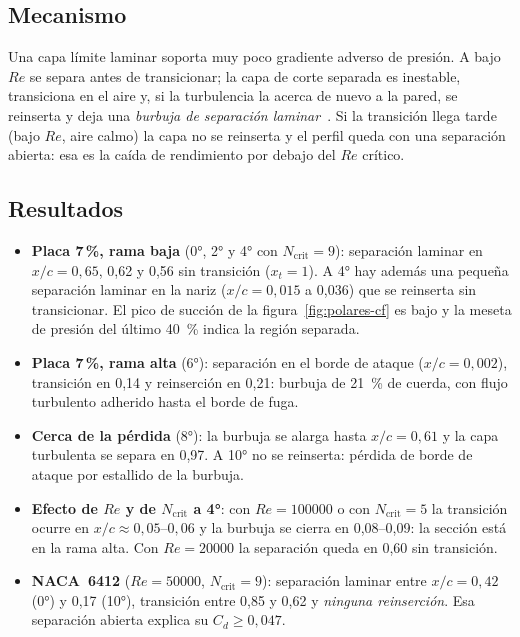 \subsection{Mecanismo}
Una capa límite laminar soporta muy poco gradiente adverso de presión. A bajo $Re$ se
separa antes de transicionar; la capa de corte separada es inestable, transiciona en el
aire y, si la turbulencia la acerca de nuevo a la pared, se reinserta y deja una
\emph{burbuja de separación laminar}~\cite{lissaman1983,mueller2003}. Si la transición
llega tarde (bajo $Re$, aire calmo) la capa no se reinserta y el perfil queda con una
separación abierta: esa es la caída de rendimiento por debajo del $Re$ crítico.

\subsection{Resultados}
\begin{itemize}
  \item \textbf{Placa 7\,\%, rama baja} (\ang{0}, \ang{2} y \ang{4} con
        $N_{\text{crit}}=9$): separación laminar en $x/c=0{,}65$, 0,62 y 0,56 sin
        transición ($x_t=1$). A \ang{4} hay además una pequeña separación laminar en la
        nariz ($x/c=0{,}015$ a 0,036) que se reinserta sin transicionar. El pico de
        succión de la figura~\ref{fig:polares-cf} es bajo y la meseta de presión del
        último \SI{40}{\percent} indica la región separada.
  \item \textbf{Placa 7\,\%, rama alta} (\ang{6}): separación en el borde de ataque
        ($x/c=0{,}002$), transición en 0,14 y reinserción en 0,21: burbuja de
        \SI{21}{\percent} de cuerda, con flujo turbulento adherido hasta el borde de fuga.
  \item \textbf{Cerca de la pérdida} (\ang{8}): la burbuja se alarga hasta $x/c=0{,}61$ y
        la capa turbulenta se separa en 0,97. A \ang{10} no se reinserta: pérdida de
        borde de ataque por estallido de la burbuja.
  \item \textbf{Efecto de $Re$ y de $N_{\text{crit}}$ a \ang{4}}: con $Re=\num{100000}$ o
        con $N_{\text{crit}}=5$ la transición ocurre en $x/c\approx0{,}05$--$0{,}06$ y la
        burbuja se cierra en 0,08--0,09: la sección está en la rama alta. Con
        $Re=\num{20000}$ la separación queda en 0,60 sin transición.
  \item \textbf{NACA~6412} ($Re=\num{50000}$, $N_{\text{crit}}=9$): separación laminar
        entre $x/c=0{,}42$ (\ang{0}) y 0,17 (\ang{10}), transición entre 0,85 y 0,62 y
        \emph{ninguna reinserción}. Esa separación abierta explica su $C_d\ge0{,}047$.
\end{itemize}

